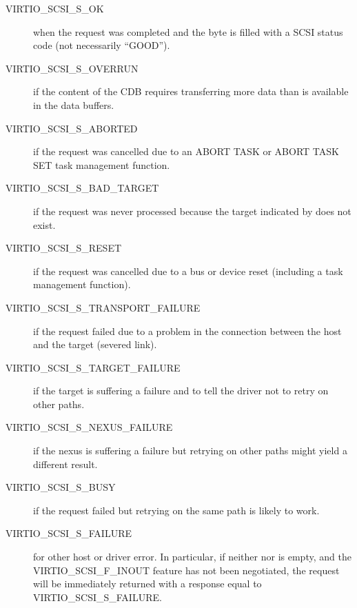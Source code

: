 \begin{description}

\item[VIRTIO_SCSI_S_OK] when the request was completed and the 
  byte is filled with a SCSI status code (not necessarily
  ``GOOD'').

\item[VIRTIO_SCSI_S_OVERRUN] if the content of the CDB requires
  transferring more data than is available in the data buffers.

\item[VIRTIO_SCSI_S_ABORTED] if the request was cancelled due to an
  ABORT TASK or ABORT TASK SET task management function.

\item[VIRTIO_SCSI_S_BAD_TARGET] if the request was never processed
  because the target indicated by  does not exist.

\item[VIRTIO_SCSI_S_RESET] if the request was cancelled due to a bus
  or device reset (including a task management function).

\item[VIRTIO_SCSI_S_TRANSPORT_FAILURE] if the request failed due to a
  problem in the connection between the host and the target
  (severed link).

\item[VIRTIO_SCSI_S_TARGET_FAILURE] if the target is suffering a
  failure and to tell the driver not to retry on other paths.

\item[VIRTIO_SCSI_S_NEXUS_FAILURE] if the nexus is suffering a failure
  but retrying on other paths might yield a different result.

\item[VIRTIO_SCSI_S_BUSY] if the request failed but retrying on the
  same path is likely to work.

\item[VIRTIO_SCSI_S_FAILURE] for other host or driver error. In
  particular, if neither  nor  is empty, and the
  VIRTIO_SCSI_F_INOUT feature has not been negotiated, the
  request will be immediately returned with a response equal to
  VIRTIO_SCSI_S_FAILURE.
\end{description}


